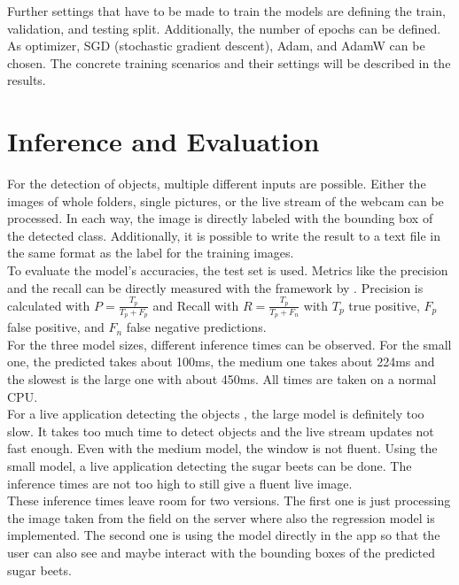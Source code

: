 Further settings that have to be made to train the models are defining the train, validation, and testing split. Additionally, the number of epochs can be defined. As optimizer, SGD (stochastic gradient descent), Adam, and AdamW can be chosen. The concrete training scenarios and their settings will be described in the results. 

\section{Inference and Evaluation}
For the detection of objects, multiple different inputs are possible. Either the images of whole folders, single pictures, or the live stream of the webcam can be processed. In each way, the image is directly labeled with the bounding box of the detected class. Additionally, it is possible to write the result to a text file in the same format as the label for the training images. \\

To evaluate the model's accuracies, the test set is used. Metrics like the precision and the recall can be directly measured with the framework by \cite{yolov5}. Precision is calculated with $ P = \frac{T_p}{T_p + F_p} $ and Recall with $ R = \frac{T_p}{T_p + F_n} $ with $ T_p $ true positive, $ F_p $ false positive, and $ F_n $ false negative predictions.\\

For the three model sizes, different inference times can be observed. For the small one, the predicted takes about 100ms, the medium one takes about 224ms and the slowest is the large one with about 450ms. All times are taken on a normal CPU. \\

For a live application detecting the objects , the large model is definitely too slow. It takes too much time to detect objects and the live stream updates not fast enough. Even with the medium model, the window is not fluent. Using the small model, a live application detecting the sugar beets can be done. The inference times are not too high to still give a fluent live image. \\

These inference times leave room for two versions. The first one is just processing the image taken from the field on the server where also the regression model is implemented. The second one is using the model directly in the app so that the user can also see and maybe interact with the bounding boxes of the predicted sugar beets. 

